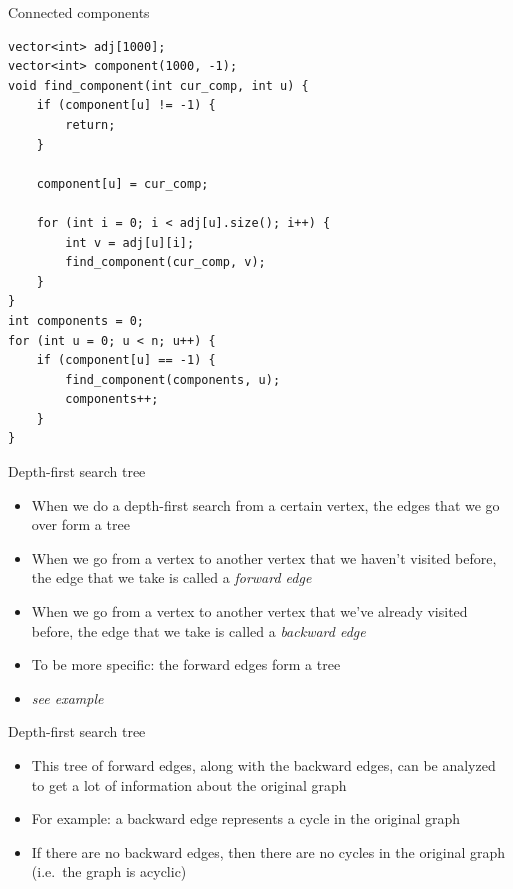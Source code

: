 \documentclass{beamer}
\begin{document}
\begin{frame}{Connected components}
    \begin{verbatim}
vector<int> adj[1000];
vector<int> component(1000, -1);
void find_component(int cur_comp, int u) {
    if (component[u] != -1) {
        return;
    }

    component[u] = cur_comp;

    for (int i = 0; i < adj[u].size(); i++) {
        int v = adj[u][i];
        find_component(cur_comp, v);
    }
}
int components = 0;
for (int u = 0; u < n; u++) {
    if (component[u] == -1) {
        find_component(components, u);
        components++;
    }
}
    \end{verbatim}
\end{frame}

\begin{frame}[plain]{Depth-first search tree}
    \vspace{30pt}

    \begin{itemize}
        \item When we do a depth-first search from a certain vertex, the edges
            that we go over form a tree
        \item When we go from a vertex to another vertex that we haven't visited before, the edge that we take is called a \textit{forward edge}
        \item When we go from a vertex to another vertex that we've already visited before, the edge that we take is called a \textit{backward edge}
        \item To be more specific: the forward edges form a tree
        \vspace{20pt}
        \item \textit{see example}
    \end{itemize}
\end{frame}

\begin{frame}[plain]{Depth-first search tree}
    \vspace{30pt}

    \begin{itemize}
        \item This tree of forward edges, along with the backward edges, can be analyzed to get a lot of information about the original graph
        \vspace{10pt}
        \item For example: a backward edge represents a cycle in the original graph
        \item If there are no backward edges, then there are no cycles in the original graph (i.e.\ the graph is acyclic)
    \end{itemize}
\end{frame}
\end{document}
